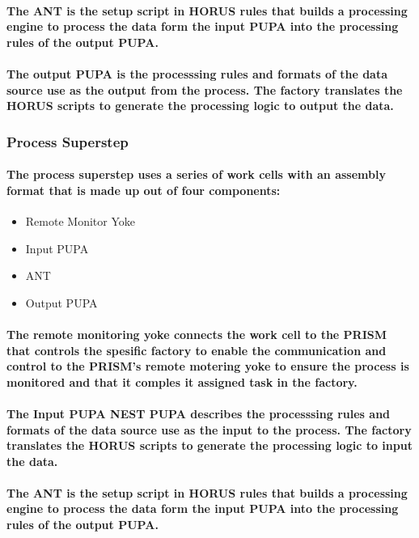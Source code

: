 \documentclass{acm_proc_article-sp}
\begin{document}
\paragraph{The ANT is the setup script in HORUS rules that builds a processing engine to process the data form the input PUPA into the processing rules of the output PUPA. }
\paragraph{The output PUPA is the processsing rules and formats of the data source use as the output from the process. The factory translates the HORUS scripts to generate the processing logic to output the data.}
\subsubsection{Process Superstep}
\paragraph{The process superstep uses a series of work cells with an assembly format that is made up out of four components:}
\begin{itemize}
\item{Remote Monitor Yoke}
\item{Input PUPA}
\item{ANT}
\item{Output PUPA}
\end{itemize}
\paragraph{The remote monitoring yoke connects the work cell to the PRISM that controls the spesific factory to enable the communication and control to the PRISM's remote motering yoke to ensure the process is monitored and that it comples it assigned task in the factory.}
\paragraph{The Input PUPA NEST PUPA describes the processsing rules and formats of the data source use as the input to the process. The factory translates the HORUS scripts to generate the processing logic to input the data.}
\paragraph{The ANT is the setup script in HORUS rules that builds a processing engine to process the data form the input PUPA into the processing rules of the output PUPA. }
\end{document}
